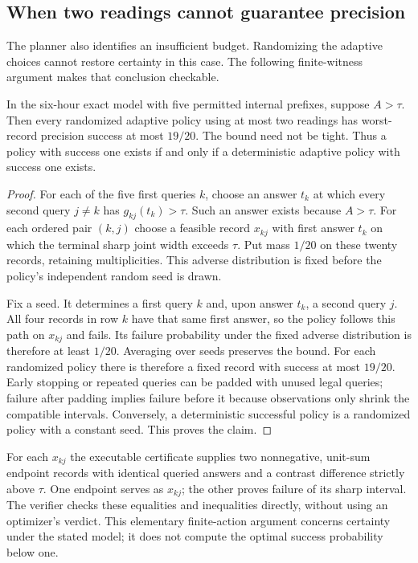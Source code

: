 \subsection{When two readings cannot guarantee precision}
\label{sec:assurance-feasibility}
The planner also identifies an insufficient budget. Randomizing the
adaptive choices cannot restore certainty in this case. The following
finite-witness argument makes that conclusion checkable.

\begin{proposition}
\label{prop:assurance-feasibility}
In the six-hour exact model with five permitted internal prefixes,
suppose $A>\tau$. Then every randomized
adaptive policy using at most two readings has worst-record precision
success at most $19/20$. The bound need not be tight. Thus a policy with
success one exists if and only if a deterministic adaptive policy with
success one exists.
\end{proposition}
\begin{proof}
For each of the five first queries $k$, choose an answer $t_k$ at which
every second query $j\ne k$ has $g_{kj}(t_k)>\tau$. Such an answer exists
because $A>\tau$. For each ordered pair $(k,j)$ choose a feasible record
$x_{kj}$ with first answer $t_k$ on which the terminal sharp joint width
exceeds $\tau$. Put mass $1/20$ on these twenty records, retaining
multiplicities. This adverse distribution is fixed before the policy's
independent random seed is drawn.

Fix a seed. It determines a first query $k$ and, upon answer $t_k$, a
second query $j$. All four records in row $k$ have that same first answer,
so the policy follows this path on $x_{kj}$ and fails. Its failure
probability under the fixed adverse distribution is therefore at least
$1/20$. Averaging over seeds preserves the bound. For each randomized
policy there is therefore a fixed record with success at most $19/20$.
Early stopping or repeated queries can be padded with unused legal queries;
failure after padding implies failure before it because observations only
shrink the compatible intervals. Conversely, a deterministic successful
policy is a randomized policy with a constant seed. This proves the claim.
\end{proof}

For each $x_{kj}$ the executable certificate supplies two nonnegative,
unit-sum endpoint records with identical queried answers and a contrast
difference strictly above $\tau$. One endpoint serves as $x_{kj}$; the
other proves failure of its sharp interval. The verifier checks these
equalities and inequalities directly, without using an optimizer's verdict.
This elementary finite-action argument concerns certainty under the stated
model; it does not compute the optimal success probability below one.
